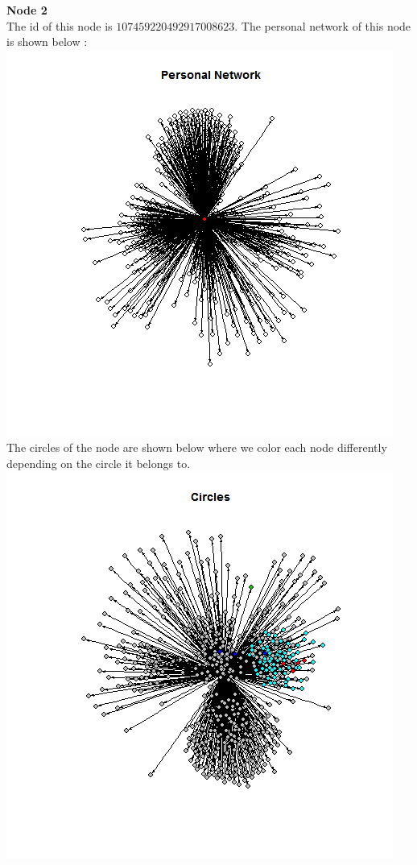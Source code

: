 \documentclass{article}
\begin{document}
\textbf{Node 2 }\\
The id of this node is $107459220492917008623$.
The personal network of this node is shown below :\\
\includegraphics[scale=0.6]{7_2a} \\
The circles of the node are shown below where we color each node differently
depending on the circle it belongs to.\\
\includegraphics[scale=0.6]{7_2d} \\
\end{document}
